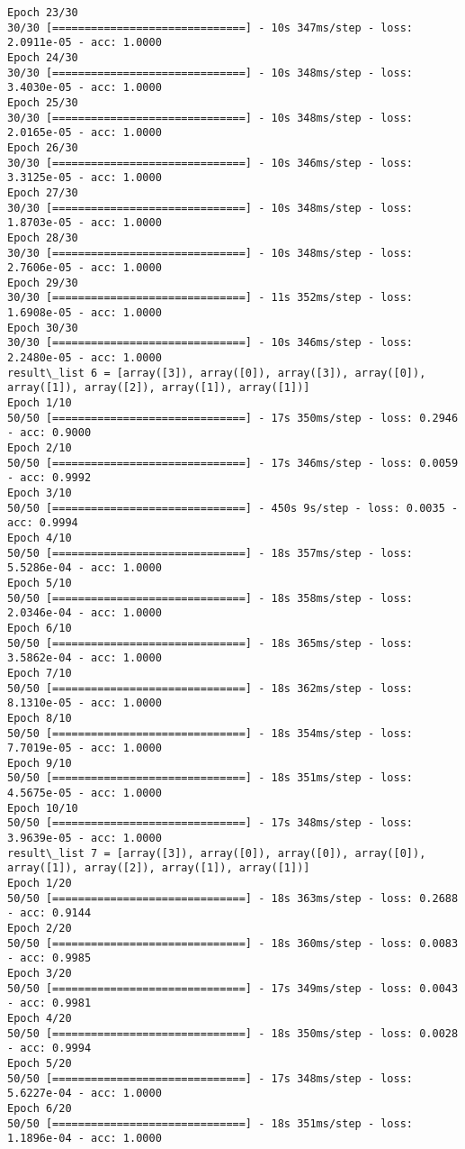 \documentclass[11pt]{article}
\begin{document}
\begin{Verbatim}[commandchars=\\\{\}]
Epoch 23/30
30/30 [==============================] - 10s 347ms/step - loss: 2.0911e-05 - acc: 1.0000
Epoch 24/30
30/30 [==============================] - 10s 348ms/step - loss: 3.4030e-05 - acc: 1.0000
Epoch 25/30
30/30 [==============================] - 10s 348ms/step - loss: 2.0165e-05 - acc: 1.0000
Epoch 26/30
30/30 [==============================] - 10s 346ms/step - loss: 3.3125e-05 - acc: 1.0000
Epoch 27/30
30/30 [==============================] - 10s 348ms/step - loss: 1.8703e-05 - acc: 1.0000
Epoch 28/30
30/30 [==============================] - 10s 348ms/step - loss: 2.7606e-05 - acc: 1.0000
Epoch 29/30
30/30 [==============================] - 11s 352ms/step - loss: 1.6908e-05 - acc: 1.0000
Epoch 30/30
30/30 [==============================] - 10s 346ms/step - loss: 2.2480e-05 - acc: 1.0000
result\_list 6 = [array([3]), array([0]), array([3]), array([0]), array([1]), array([2]), array([1]), array([1])]
Epoch 1/10
50/50 [==============================] - 17s 350ms/step - loss: 0.2946 - acc: 0.9000
Epoch 2/10
50/50 [==============================] - 17s 346ms/step - loss: 0.0059 - acc: 0.9992
Epoch 3/10
50/50 [==============================] - 450s 9s/step - loss: 0.0035 - acc: 0.9994
Epoch 4/10
50/50 [==============================] - 18s 357ms/step - loss: 5.5286e-04 - acc: 1.0000
Epoch 5/10
50/50 [==============================] - 18s 358ms/step - loss: 2.0346e-04 - acc: 1.0000
Epoch 6/10
50/50 [==============================] - 18s 365ms/step - loss: 3.5862e-04 - acc: 1.0000
Epoch 7/10
50/50 [==============================] - 18s 362ms/step - loss: 8.1310e-05 - acc: 1.0000
Epoch 8/10
50/50 [==============================] - 18s 354ms/step - loss: 7.7019e-05 - acc: 1.0000
Epoch 9/10
50/50 [==============================] - 18s 351ms/step - loss: 4.5675e-05 - acc: 1.0000
Epoch 10/10
50/50 [==============================] - 17s 348ms/step - loss: 3.9639e-05 - acc: 1.0000
result\_list 7 = [array([3]), array([0]), array([0]), array([0]), array([1]), array([2]), array([1]), array([1])]
Epoch 1/20
50/50 [==============================] - 18s 363ms/step - loss: 0.2688 - acc: 0.9144
Epoch 2/20
50/50 [==============================] - 18s 360ms/step - loss: 0.0083 - acc: 0.9985
Epoch 3/20
50/50 [==============================] - 17s 349ms/step - loss: 0.0043 - acc: 0.9981
Epoch 4/20
50/50 [==============================] - 18s 350ms/step - loss: 0.0028 - acc: 0.9994
Epoch 5/20
50/50 [==============================] - 17s 348ms/step - loss: 5.6227e-04 - acc: 1.0000
Epoch 6/20
50/50 [==============================] - 18s 351ms/step - loss: 1.1896e-04 - acc: 1.0000

\end{Verbatim}
\end{document}
